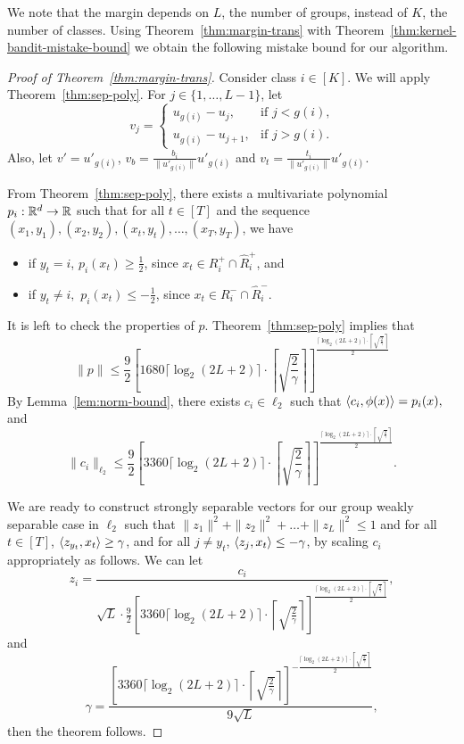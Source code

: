 We note that the margin depends on $L$, the number of groups, instead of $K$, the number of classes.  Using Theorem~\ref{thm:margin-trans} with Theorem~\ref{thm:kernel-bandit-mistake-bound} we obtain the following mistake bound for our algorithm.

\begin{proof}[Proof of Theorem~\ref{thm:margin-trans}]

Consider class $i\in[K]$. We will apply
Theorem~\ref{thm:sep-poly}. For $j\in\{1,\ldots,L-1\}$, let
\[
v_j=\left\{
\begin{array}{ll}
    u_{g(i)}-u_j, & \mbox{if $j<g(i)$,} \\
    u_{g(i)}-u_{j+1}, & \mbox{if $j>g(i)$.}
\end{array}
\right.    
\]
Also, let $v'=u'_{g(i)}$, $v_b=\frac{b_i}{\|u'_{g(i)}\|}u'_{g(i)}$
and $v_t=\frac{t_i}{\|u'_{g(i)}\|}u'_{g(i)}$.

From Theorem~\ref{thm:sep-poly}, there exists a multivariate
polynomial $p_i:{\mathbb{R}}^d\to {\mathbb{R}}$ such that for all $t\in[T]$ and the
sequence $(x_1,y_1),(x_2,y_2),(x_t,y_t),\ldots,(x_T,y_T)$, we have
\begin{itemize}
\item if $y_t=i$, $p_i(x_t)\geq \frac{1}{2}$, since $x_t\in R^{+}_i
    \cap \hat{R}^{+}_i$, and
\item if $y_t\neq i,$ $p_i(x_t)\leq -\frac{1}{2}$, since $x_t\in
    R^{-}_i \cap \hat{R}^{-}_i$.
\end{itemize}

It is left to check the properties of $p$.
Theorem~\ref{thm:sep-poly} implies that
\[
\|p\|\leq \frac{9}{2}\left[1680\lceil\log_2(2L+2)\rceil\cdot\left\lceil\sqrt{\frac{2}{\gamma}}\right\rceil\right]^{\frac{\lceil\log_2(2L+2)\rceil\cdot\left\lceil\sqrt{\frac{2}{\gamma}}\right\rceil}{2}}
\]
By Lemma~\ref{lem:norm-bound}, there exists $c_i\in\ell_2$ such that $\langle c_i,\phi(x)\rangle=p_i(x),$ and
\[
\|c_i\|_{\ell_2}\leq \frac{9}{2}\left[3360\lceil\log_2(2L+2)\rceil\cdot\left\lceil\sqrt{\frac{2}{\gamma}}\right\rceil\right]^{\frac{\lceil\log_2(2L+2)\rceil\cdot\left\lceil\sqrt{\frac{2}{\gamma}}\right\rceil}{2}}.
\]

We are ready to construct strongly separable vectors for our group
weakly separable case in $\ell_2$ such that
$\|z_1\|^2+\|z_2\|^2+\ldots+\|z_L\|^2\leq 1$ and for all $t\in [T]$,
$\langle z_{y_t},x_t\rangle \geq \gamma$, and for all $j\neq y_t$,
$\langle z_j,x_t\rangle\leq -\gamma$, by scaling $c_i$ appropriately as
follows.  We can let
\[
z_i=\frac{c_i}{\sqrt{L}\cdot \frac{9}{2}\left[3360\lceil\log_2(2L+2)\rceil\cdot\left\lceil\sqrt{\frac{2}{\gamma}}\right\rceil\right]^{\frac{\lceil\log_2(2L+2)\rceil\cdot\left\lceil\sqrt{\frac{2}{\gamma}}\right\rceil}{2}}},
\]
and
\[
\gamma = \frac{\left[3360\lceil\log_2(2L+2)\rceil\cdot\left\lceil\sqrt{\frac{2}{\gamma}}\right\rceil\right]^{-\frac{\lceil\log_2(2L+2)\rceil\cdot\left\lceil\sqrt{\frac{2}{\gamma}}\right\rceil}{2}}}{9\sqrt{L}},
\]
then the theorem follows.    
\end{proof}


